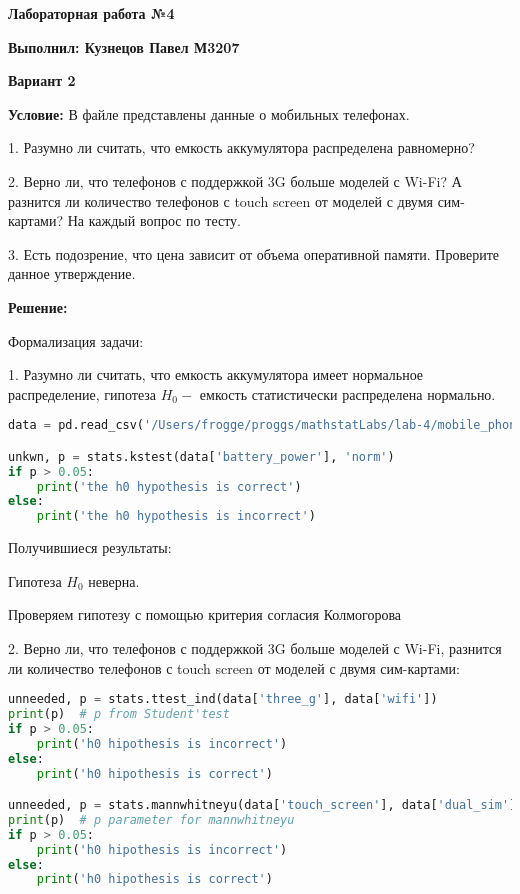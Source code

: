 \documentclass{article}
\begin{document}
\Large\textbf{Лабораторная работа №4}

\textbf{Выполнил: Кузнецов Павел М3207}

\textbf{Вариант 2}
\vspace{5mm}

\textbf{Условие:}
В файле представлены данные о мобильных телефонах.

1. Разумно ли считать, что емкость аккумулятора распределена равномерно?

2. Верно ли, что телефонов с поддержкой 3G больше моделей с Wi-Fi? А разнится ли количество телефонов с touch screen от моделей с двумя сим-картами? На каждый вопрос по тесту.

3. Есть подозрение, что цена зависит от объема оперативной памяти. Проверите данное утверждение.
\vspace{5mm}

\textbf{Решение:}

Формализация задачи:

1. Разумно ли считать, что емкость аккумулятора имеет нормальное распределение, гипотеза $H_0 - $ емкость статистически распределена нормально.

\begin{lstlisting}[language=Python, mathescape=true, breaklines=true]
data = pd.read_csv('/Users/frogge/proggs/mathstatLabs/lab-4/mobile_phones.csv')

unkwn, p = stats.kstest(data['battery_power'], 'norm')
if p > 0.05:
    print('the h0 hypothesis is correct')
else:
    print('the h0 hypothesis is incorrect')

\end{lstlisting}   
Получившиеся результаты:

Гипотеза $H_0$ неверна.

Проверяем гипотезу с помощью критерия согласия Колмогорова

2. Верно ли, что телефонов с поддержкой 3G больше моделей с Wi-Fi, разнится ли количество телефонов с touch screen от моделей с двумя сим-картами:
\begin{lstlisting}[language=Python, mathescape=true, breaklines=true]
unneeded, p = stats.ttest_ind(data['three_g'], data['wifi'])
print(p)  # p from Student'test
if p > 0.05:
    print('h0 hipothesis is incorrect')
else:
    print('h0 hipothesis is correct')

unneeded, p = stats.mannwhitneyu(data['touch_screen'], data['dual_sim'])
print(p)  # p parameter for mannwhitneyu
if p > 0.05:
    print('h0 hipothesis is incorrect')
else:
    print('h0 hipothesis is correct')
\end{lstlisting}   
\end{document}
